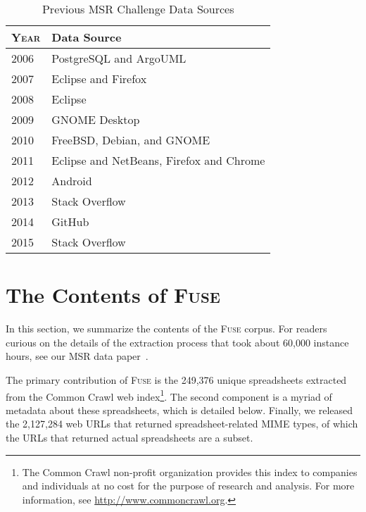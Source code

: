 \documentclass[conference]{IEEEtran}
\newcommand{\urlcount}{2,127,284}
\newcommand{\xlscount}{249,376}
\begin{document}
\begin{table}[!t]
\caption{Previous MSR Challenge Data Sources\label{tab:datasources}}
\centering
\begin{tabular}{ll}
\toprule
\textbf{\textsc{Year}} & \textbf{Data Source}\\
\midrule
2006 & PostgreSQL and ArgoUML\\
2007 & Eclipse and Firefox\\
2008 & Eclipse\\
2009 & GNOME Desktop\\
2010 & FreeBSD, Debian, and GNOME\\
2011 & Eclipse and NetBeans, Firefox and Chrome\\
2012 & Android\\
2013 & Stack Overflow\\
2014 & GitHub\\
2015 & Stack Overflow\\
\bottomrule
\end{tabular}
\end{table}



\section{The Contents of \textsc{Fuse}}

In this section, we summarize the contents of the \textsc{Fuse} corpus.
For readers curious on the details of the extraction process that took about 60,000 instance hours, see our MSR data paper~\cite{barik2015}.

The primary contribution of \textsc{Fuse} is the \xlscount{} unique spreadsheets extracted from the Common Crawl web index\footnote{The Common Crawl non-profit organization provides this index to companies and individuals at no cost for the purpose of research and analysis. For more information, see \url{http://www.commoncrawl.org}.}.
The second component is a myriad of metadata about these spreadsheets, which is detailed below.
Finally, we released the \urlcount{} web URLs that returned spreadsheet-related MIME types, of which the URLs that returned actual spreadsheets are a subset.
\end{document}
